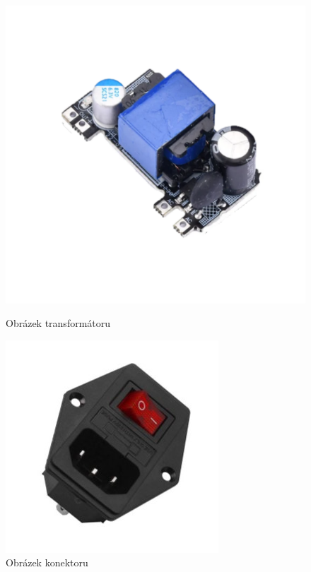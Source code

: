 \documentclass{article}
\begin{document}
\begin{figure}[!tbp]
  \centering
  \begin{minipage}[b]{0.3\textwidth}
    \includegraphics[width=\textwidth]{images/trafo.png}
    \caption{Obrázek transformátoru\cite{obrazek_trafo}}
    \label{trafo}
  \end{minipage}
  \hfill
  \begin{minipage}[b]{0.3\textwidth}
    \includegraphics[width=\textwidth]{images/zasuvka.jpg}
    \caption{Obrázek konektoru\cite{obrazek_konektor}}
    \label{konektor}
  \end{minipage}
\end{figure}


\printbibliography[heading=bibintoc,title={Použitá literatura}]
\end{document}
